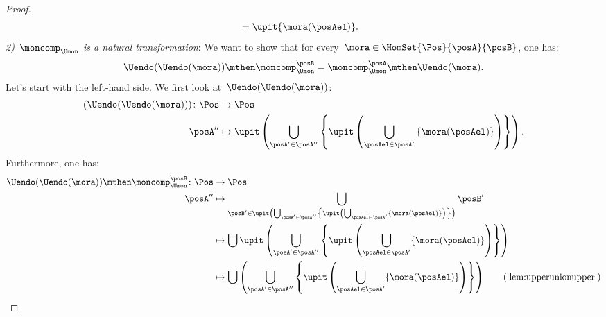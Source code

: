 \begin{proof}
\begin{equation}
\begin{aligned}
			                                                                 & =\upit \{\mora(\posAel)\}.
		\end{aligned}
	\end{equation}
	\emph{2)~$\moncomp_{\Umon}$ is a natural transformation}:
	We want to show that for every~$\mora\in \HomSet{\Pos}{\posA}{\posB}$, one has:
	\begin{equation}
		\Uendo(\Uendo(\mora))\mthen \moncomp_{\Umon}^{\posB}=\moncomp_{\Umon}^\posA \mthen \Uendo(\mora).
	\end{equation}
	Let's start with the left-hand side.
	We first look at~$\Uendo(\Uendo(\mora))$:
	\begin{equation}
		\begin{aligned}
			(\Uendo(\Uendo(\mora)))
			\colon \Pos & \to \Pos                                                                                                                                                  \\
			\posA''     & \mapsto \upit \left( \bigcup_{\posA' \in \posA''}\left \{ \upit \left( \bigcup_{\posAel \in \posA'} \left\{ \mora(\posAel)\right\}\right)\right\}\right).
		\end{aligned}
	\end{equation}
	Furthermore, one has:
	\begin{equation}
		\begin{aligned}
			\Uendo(\Uendo(\mora))\mthen \moncomp_{\Umon}^{\posB}\colon \Pos & \to \Pos                                                                                                                                                                                         \\
			\posA''                                                         & \mapsto \bigcup_{\posB'\in \upit \left( \bigcup_{\posA'\in \posA''} \left\{ \upit \left( \bigcup_{\posAel \in \posA'} \{ \mora(\posAel)\}\right)\right\} \right)} \posB'                         \\
			                                                                & \mapsto \bigcup \upit \left( \bigcup_{\posA'\in \posA''} \left\{ \upit \left( \bigcup_{\posAel \in \posA'} \{ \mora(\posAel)\}\right)\right\} \right)                                            \\
			                                                                & \mapsto \bigcup  \left( \bigcup_{\posA'\in \posA''} \left\{ \upit \left( \bigcup_{\posAel \in \posA'} \{ \mora(\posAel)\}\right)\right\} \right) \quad \quad (\text{\cref{lem:upperunionupper}}) \\

\end{aligned}
\end{equation}
\end{proof}
